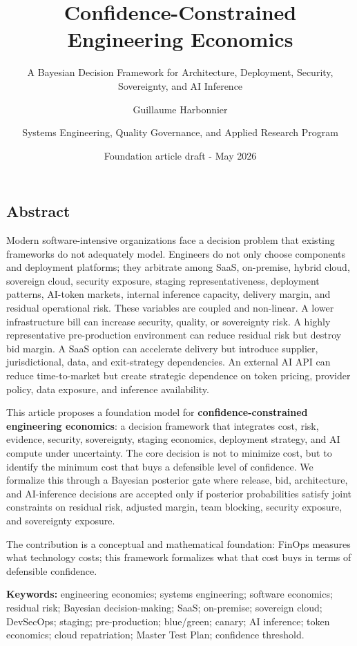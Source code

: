 \documentclass[
]{article}
\title{Confidence-Constrained Engineering Economics}
\subtitle{A Bayesian Decision Framework for Architecture, Deployment,
Security, Sovereignty, and AI Inference}
\author{Guillaume Harbonnier \and Systems Engineering, Quality
Governance, and Applied Research Program}
\date{Foundation article draft - May 2026}
\begin{document}
\maketitle

\subsection{Abstract}\label{abstract}

Modern software-intensive organizations face a decision problem that
existing frameworks do not adequately model. Engineers do not only
choose components and deployment platforms; they arbitrate among SaaS,
on-premise, hybrid cloud, sovereign cloud, security exposure, staging
representativeness, deployment patterns, AI-token markets, internal
inference capacity, delivery margin, and residual operational risk.
These variables are coupled and non-linear. A lower infrastructure bill
can increase security, quality, or sovereignty risk. A highly
representative pre-production environment can reduce residual risk but
destroy bid margin. A SaaS option can accelerate delivery but introduce
supplier, jurisdictional, data, and exit-strategy dependencies. An
external AI API can reduce time-to-market but create strategic
dependence on token pricing, provider policy, data exposure, and
inference availability.

This article proposes a foundation model for
\textbf{confidence-constrained engineering economics}: a decision
framework that integrates cost, risk, evidence, security, sovereignty,
staging economics, deployment strategy, and AI compute under
uncertainty. The core decision is not to minimize cost, but to identify
the minimum cost that buys a defensible level of confidence. We
formalize this through a Bayesian posterior gate where release, bid,
architecture, and AI-inference decisions are accepted only if posterior
probabilities satisfy joint constraints on residual risk, adjusted
margin, team blocking, security exposure, and sovereignty exposure.

The contribution is a conceptual and mathematical foundation: FinOps
measures what technology costs; this framework formalizes what that cost
buys in terms of defensible confidence.

\textbf{Keywords:} engineering economics; systems engineering; software
economics; residual risk; Bayesian decision-making; SaaS; on-premise;
sovereign cloud; DevSecOps; staging; pre-production; blue/green; canary;
AI inference; token economics; cloud repatriation; Master Test Plan;
confidence threshold.
\end{document}

